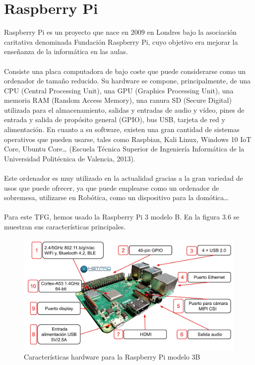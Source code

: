 \documentclass{report}
\begin{document}
\section{Raspberry Pi}

Raspberry Pi es un proyecto que nace en 2009 en Londres bajo la asociación caritativa denominada Fundación Raspberry Pi, cuyo objetivo era mejorar la enseñanza de la informática en las aulas.
\\
\\
Consiste una placa computadora de bajo coste que puede considerarse como un ordenador de tamaño reducido. Su hardware se compone, principalmente, de una CPU (Central Processing Unit), una GPU (Graphics Processing Unit), una memoria RAM (Random Access Memory), una ranura SD (Secure Digital) utilizada para el almacenamiento, salidas y entradas de audio y vídeo, pines de entrada y salida de propósito general (GPIO), bus USB, tarjeta de red y alimentación. En cuanto a su software, existen una gran cantidad de sistemas operativos que pueden usarse, tales como  Raspbian, Kali Linux, Windows 10 IoT Core, Ubuntu Core… (Escuela Técnica Superior de Ingeniería Informática de la Universidad Politécnica de Valencia, 2013).
\\
\\
Este ordenador es muy utilizado en la actualidad gracias a la gran variedad de usos que puede ofrecer, ya que puede emplearse como un ordenador de sobremesa, utilizarse en Robótica, como un dispositivo para la domótica…
\\
\\
Para este TFG, hemos usado la Raspberry Pi 3 modelo B. En la figura 3.6 se muestran sus características principales.
\\
\begin{figure}[h!]
  \centering
    \includegraphics[width=1\textwidth]{images/hardware_RaspberryPi.png}
  \caption{Características hardware para la Raspberry Pi modelo 3B}
  \label{Características hardware para la Raspberry Pi modelo 3B}
\end{figure}
\end{document}
